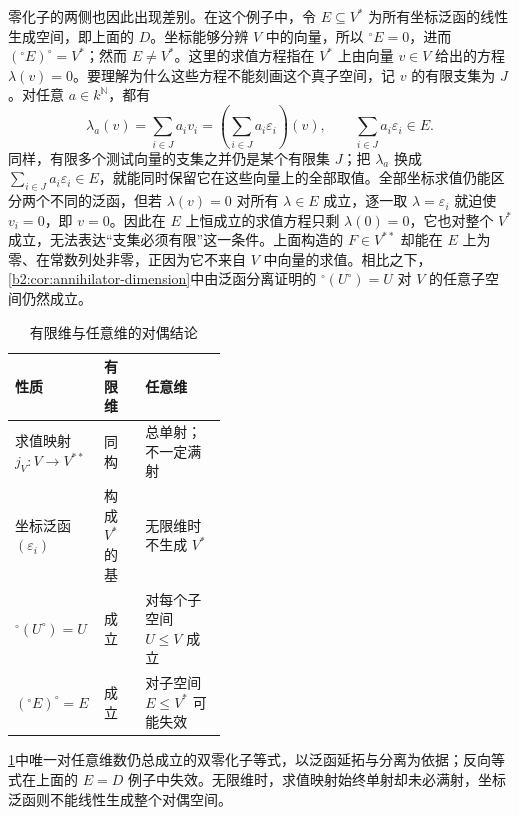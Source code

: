 \ProseParagraphBreak
零化子的两侧也因此出现差别。在这个例子中，令 \(E\subseteq V^*\) 为所有坐标泛函的线性生成空间，即上面的 \(D\)。坐标能够分辨 \(V\) 中的向量，所以 \({}^\circ E=0\)，进而 \(({}^\circ E)^\circ=V^*\)；然而 \(E\ne V^*\)。这里的求值方程指在 \(V^*\) 上由向量 \(v\in V\) 给出的方程 \(\lambda(v)=0\)。要理解为什么这些方程不能刻画这个真子空间，记 \(v\) 的有限支集为 \(J\)。对任意 \(a\in k^{\mathbb N}\)，都有
\[
	\lambda_a(v)=\sum_{i\in J}a_iv_i =\left(\sum_{i\in J}a_i\varepsilon_i\right)(v), \qquad \sum_{i\in J}a_i\varepsilon_i\in E.
\]
同样，有限多个测试向量的支集之并仍是某个有限集 \(J\)；把 \(\lambda_a\) 换成 \(\sum_{i\in J}a_i\varepsilon_i\in E\)，就能同时保留它在这些向量上的全部取值。全部坐标求值仍能区分两个不同的泛函，但若 \(\lambda(v)=0\) 对所有 \(\lambda\in E\) 成立，逐一取 \(\lambda=\varepsilon_i\) 就迫使 \(v_i=0\)，即 \(v=0\)。因此在 \(E\) 上恒成立的求值方程只剩 \(\lambda(0)=0\)，它也对整个 \(V^*\) 成立，无法表达“支集必须有限”这一条件。上面构造的 \(F\in V^{**}\) 却能在 \(E\) 上为零、在常数列处非零，正因为它不来自 \(V\) 中向量的求值。相比之下，\cref{b2:cor:annihilator-dimension}中由泛函分离证明的 \({}^\circ(U^\circ)=U\) 对 \(V\) 的任意子空间仍然成立。

\begin{table}[htbp]
	\centering
	\caption{有限维与任意维的对偶结论}\label{b2:tab:dual-dimension-comparison}
	\begin{tabularx}{\linewidth}{@{}p{0.42\linewidth}XX@{}}
		\toprule
		性质 & 有限维 & 任意维 \\
		\midrule
		求值映射 \(j_V:V\to V^{**}\) & 同构 & 总单射；不一定满射 \\
		坐标泛函 \((\varepsilon_i)\) & 构成 \(V^*\) 的基 & 无限维时不生成 \(V^*\) \\
		\({}^\circ(U^\circ)=U\) & 成立 & 对每个子空间 \(U\le V\) 成立 \\
		\(({}^\circ E)^\circ=E\) & 成立 & 对子空间 \(E\le V^*\) 可能失效 \\
		\bottomrule
	\end{tabularx}
\end{table}
\cref{b2:tab:dual-dimension-comparison}中唯一对任意维数仍总成立的双零化子等式，以泛函延拓与分离为依据；反向等式在上面的 \(E=D\) 例子中失效。无限维时，求值映射始终单射却未必满射，坐标泛函则不能线性生成整个对偶空间。
